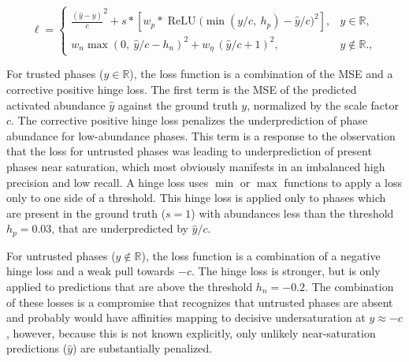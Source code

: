 \begin{equation}
  \ell = \begin{cases}
    \frac{(\hat y - y)}{c}^2 + s*[w_p * \operatorname{ReLU}\!\big(\min(y/c,\ h_p) - \hat y/c\big)^2], & y \in \mathbb{R} ,\\[2pt]
    w_n\max(0,\ \hat y/c - h_n)^2 + w_\eta \,(\hat y/c + 1)^2, & y \notin \mathbb{R} .,
  \end{cases}
  \label{eq:affloss}
\end{equation}

For trusted phases ($y \in \mathbb{R}$), the loss function is a combination of the MSE and a corrective positive hinge loss. The first term is the MSE of the predicted activated abundance $\hat y$ against the ground truth $y$, normalized by the scale factor $c$. 
The corrective positive hinge loss penalizes the underprediction of phase abundance for low-abundance phases. This term is a response to the observation that
the loss for untrusted phases was leading to underprediction of present phases near saturation, which most obviously manifests in an imbalanced high precision and low recall. 
A hinge loss uses $\min$ or $\max$ functions to apply a loss only to one side of a threshold. This hinge loss is applied only to phases which are present in the ground truth ($s=1$) 
with abundances less than the threshold $h_p = 0.03$, that are underpredicted by $\hat y/c$. 

For untrusted phases ($y \notin \mathbb{R}$), the loss function is a combination of a negative hinge loss and a weak pull towards $-c$. The hinge loss is stronger, but is only
applied to predictions that are above the threshold $h_n = -0.2$. The combination of these losses is a compromise that 
recognizes that untrusted phases are absent and probably would have affinities mapping to decisive undersaturation at $y\approx-c$, however, because this is not known explicitly,
only unlikely near-saturation predictions ($\hat y$) are substantially penalized.

